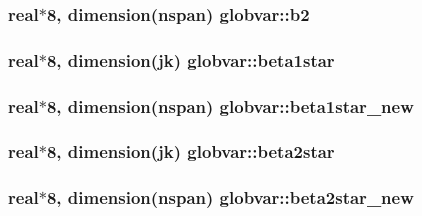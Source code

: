 \subsubsection[{b2}]{\setlength{\rightskip}{0pt plus 5cm}real$\ast$8, dimension({\bf nspan}) globvar\+::b2}\label{namespaceglobvar_a6c6b282f127b3722eee82e9d331f535e}
\hypertarget{namespaceglobvar_abb730f89383edc04d1631f6dc16ad5c6}{}
\subsubsection[{beta1star}]{\setlength{\rightskip}{0pt plus 5cm}real$\ast$8, dimension({\bf jk}) globvar\+::beta1star}\label{namespaceglobvar_abb730f89383edc04d1631f6dc16ad5c6}
\hypertarget{namespaceglobvar_a9b66a28ec78457551885e4ad3091f8fe}{}
\subsubsection[{beta1star\+\_\+new}]{\setlength{\rightskip}{0pt plus 5cm}real$\ast$8, dimension({\bf nspan}) globvar\+::beta1star\+\_\+new}\label{namespaceglobvar_a9b66a28ec78457551885e4ad3091f8fe}
\hypertarget{namespaceglobvar_a1504d995004c2c3cd93ac71f6c9028e0}{}
\subsubsection[{beta2star}]{\setlength{\rightskip}{0pt plus 5cm}real$\ast$8, dimension({\bf jk}) globvar\+::beta2star}\label{namespaceglobvar_a1504d995004c2c3cd93ac71f6c9028e0}
\hypertarget{namespaceglobvar_aa2687515a32abc133ab720b0690976ba}{}
\subsubsection[{beta2star\+\_\+new}]{\setlength{\rightskip}{0pt plus 5cm}real$\ast$8, dimension({\bf nspan}) globvar\+::beta2star\+\_\+new}\label{namespaceglobvar_aa2687515a32abc133ab720b0690976ba}
\hypertarget{namespaceglobvar_ac2f0dd583ec6012e046c832b73410878}{}
